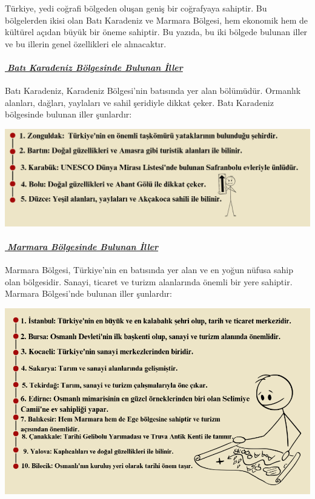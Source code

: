 \documentclass[
]{article}
\begin{document}
Türkiye, yedi coğrafi bölgeden oluşan geniş bir coğrafyaya sahiptir. Bu
bölgelerden ikisi olan Batı Karadeniz ve Marmara Bölgesi, hem ekonomik
hem de kültürel açıdan büyük bir öneme sahiptir. Bu yazıda, bu iki
bölgede bulunan iller ve bu illerin genel özellikleri ele alınacaktır.

\paragraph{\texorpdfstring{\emph{\ul{📌Batı Karadeniz Bölgesinde Bulunan
İller}}}{📌Batı Karadeniz Bölgesinde Bulunan İller}}\label{batux131-karadeniz-buxf6lgesinde-bulunan-iller}

Batı Karadeniz, Karadeniz Bölgesi'nin batısında yer alan bölümüdür.
Ormanlık alanları, dağları, yaylaları ve sahil şeridiyle dikkat çeker.
Batı Karadeniz bölgesinde bulunan iller şunlardır:

\includegraphics[width=16.04in]{batikaradeniz1}

\paragraph{\texorpdfstring{\emph{\ul{📌Marmara Bölgesinde Bulunan
İller}}}{📌Marmara Bölgesinde Bulunan İller}}\label{marmara-buxf6lgesinde-bulunan-iller}

Marmara Bölgesi, Türkiye'nin en batısında yer alan ve en yoğun nüfusa
sahip olan bölgesidir. Sanayi, ticaret ve turizm alanlarında önemli bir
yere sahiptir. Marmara Bölgesi'nde bulunan iller şunlardır:

\includegraphics[width=12.79in]{marmara1}
\end{document}
